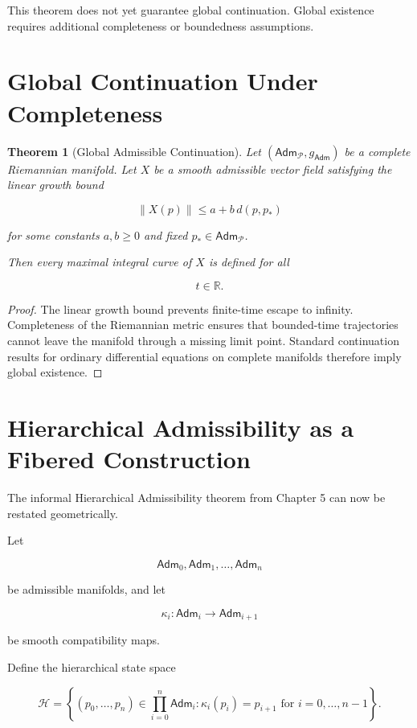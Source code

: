 \documentclass[11pt,oneside]{book}
\numberwithin{equation}{chapter}
\theoremstyle{definition}
\theoremstyle{plain}
\newtheorem{theorem}[definition]{Theorem}
\newcommand{\Adm}{\mathsf{Adm}}
\begin{document}
This theorem does not yet guarantee global continuation. Global existence
requires additional completeness or boundedness assumptions.

\section{Global Continuation Under Completeness}

\begin{theorem}[Global Admissible Continuation]

Let \((\Adm_{\mathcal P},g_{\Adm})\) be a complete Riemannian manifold. Let
\(X\) be a smooth admissible vector field satisfying the linear growth bound

\[
\|X(p)\|
\leq
a+b\,d(p,p_{\ast})
\]

for some constants \(a,b\geq 0\) and fixed
\(p_{\ast}\in\Adm_{\mathcal P}\).

Then every maximal integral curve of \(X\) is defined for all

\[
t\in\mathbb R.
\]

\end{theorem}

\begin{proof}

The linear growth bound prevents finite-time escape to infinity. Completeness
of the Riemannian metric ensures that bounded-time trajectories cannot leave
the manifold through a missing limit point. Standard continuation results
for ordinary differential equations on complete manifolds therefore imply
global existence.

\end{proof}

\section{Hierarchical Admissibility as a Fibered Construction}

The informal Hierarchical Admissibility theorem from Chapter 5 can now be
restated geometrically.

Let

\[
\Adm_0,\Adm_1,\ldots,\Adm_n
\]

be admissible manifolds, and let

\[
\kappa_i:
\Adm_i
\longrightarrow
\Adm_{i+1}
\]

be smooth compatibility maps.

Define the hierarchical state space

\[
\mathcal H
=
\left\{
(p_0,\ldots,p_n)
\in
\prod_{i=0}^{n}\Adm_i:
\kappa_i(p_i)=p_{i+1}
\text{ for }i=0,\ldots,n-1
\right\}.
\]
\end{document}
